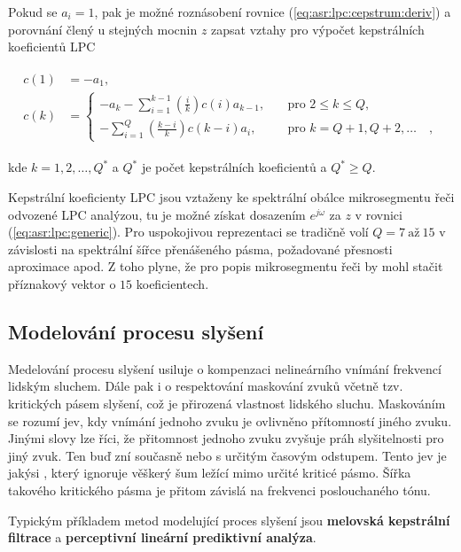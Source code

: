 \noindent Pokud se $a_i = 1$, pak je možné roznásobení rovnice (\ref{eq:asr:lpc:cepstrum:deriv}) a porovnání člený u stejných mocnin $z$ zapsat vztahy pro výpočet kepstrálních koeficientů LPC

\begin{align}
  \begin{split}
    c(1) &= -a_1, \\
    c(k) &=
    \begin{cases}
      - a_k - \sum_{i=1}^{k-1} \left(\frac{i}{k}\right) c(i) a_{k-1},  & \quad \text{pro } 2 \leq k \leq Q, \\
      - \sum_{i=1}^{Q} \left(\frac{k - i}{k}\right) c(k-i) a_i,  & \quad \text{pro } k = Q + 1, Q + 2, \dots \quad ,
    \end{cases}
  \end{split}
  \label{eq:asr:lpc:cepstrum:coef}
\end{align}

\noindent kde $k = 1, 2, \dots , Q^{*}$ a $Q^{*}$ je počet kepstrálních koeficientů a $Q^{*} \geq Q$.

Kepstrální koeficienty LPC jsou vztaženy ke spektrální obálce mikrosegmentu řeči odvozené LPC analýzou, tu je možné získat dosazením $e^{j\omega}$ za $z$ v rovnici (\ref{eq:asr:lpc:generic}). Pro uspokojivou reprezentaci se tradičně volí $Q = 7\ \text{až}\ 15$ v závislosti na spektrální šířce přenášeného pásma, požadované přesnosti aproximace apod. Z toho plyne, že pro popis mikrosegmentu řeči by mohl stačit příznakový vektor o $15$ koeficientech.

\subsection{Modelování procesu slyšení}
\label{chap:asr:parametrization:hearing}

Medelování procesu slyšení usiluje o kompenzaci nelineárního vnímání frekvencí lidským sluchem. Dále pak i o respektování maskování zvuků včetně tzv. kritických pásem slyšení, což je přirozená vlastnost lidského sluchu. Maskováním se rozumí jev, kdy vnímání jednoho zvuku je ovlivněno přítomností jiného zvuku. Jinými slovy lze říci, že přitomnost jednoho zvuku zvyšuje práh slyšitelnosti pro jiný zvuk. Ten buď zní současně nebo s určitým časovým odstupem. Tento jev je jakýsi , který ignoruje věškerý šum ležící mimo určité kriticé pásmo. Šířka takového kritického pásma je přitom závislá na frekvenci poslouchaného tónu.

Typickým příkladem metod modelující proces slyšení jsou \textbf{melovská kepstrální filtrace} a \textbf{perceptivní lineární prediktivní analýza}.

